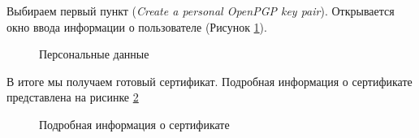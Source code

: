 \documentclass[10pt,a4paper]{report}
\begin{document}
Выбираем первый пункт (\textit{Create a personal OpenPGP key pair}). Открывается окно ввода информации о пользователе (Рисунок \ref{pic:pic1}).
	
\begin{figure}[h]
	\caption{Персональные данные}
	\label{pic:pic1}
\end{figure}

В итоге мы получаем готовый сертификат. Подробная информация о сертификате представлена на рисинке \ref{pic:pic2}

\begin{figure}[h]
	\caption{Подробная информация о сертификате}
	\label{pic:pic2}
\end{figure}
\end{document}
